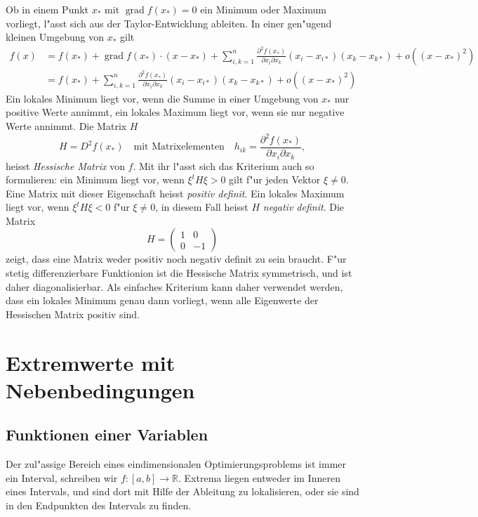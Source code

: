 Ob in einem Punkt $x_*$ mit $\operatorname{grad}f(x_*)=0$ ein
Minimum oder Maximum vorliegt, l"asst sich aus der Taylor-Entwicklung
ableiten. In einer gen"ugend kleinen Umgebung von $x_*$ gilt
\begin{align*}
f(x)&=f(x_*)+\operatorname{grad}f(x_*)\cdot (x-x_*)+
\sum_{i,k=1}^n\frac{\partial^2 f(x_*)}{\partial x_i\partial x_k}(x_i-x_{i*})(x_k-x_{k*})+o((x-x_*)^2)
\\
&=f(x_*)+
\sum_{i,k=1}^n\frac{\partial^2 f(x_*)}{\partial x_i\partial x_k}(x_i-x_{i*})(x_k-x_{k*})+o((x-x_*)^2)
\end{align*}
Ein lokales Minimum liegt vor, wenn die Summe in einer Umgebung
von $x_*$ nur positive Werte annimmt, ein lokales Maximum liegt vor,
wenn sie nur negative Werte annimmt.
Die Matrix $H$
\begin{equation}
H=D^2f(x_*) \quad\text{mit Matrixelementen}\quad
h_{ik}=
\frac{\partial^2 f(x_*)}{\partial x_i\partial x_k},
\end{equation}
heisst {\it Hessische Matrix} von $f$.
Mit ihr l"asst sich das Kriterium auch so formulieren: ein Minimum liegt vor,
wenn $\xi^t H\xi > 0$ gilt f"ur jeden Vektor $\xi\ne 0$.
Eine Matrix mit dieser Eigenschaft heisst {\it positiv definit}.
Ein lokales Maximum liegt vor, wenn $\xi^tH\xi<0$ f"ur $\xi\ne 0$,
in diesem Fall heisst $H$ {\it negativ definit}. Die Matrix 
\[
H=\begin{pmatrix}
1&0\\
0&-1
\end{pmatrix}
\]
zeigt, dass eine Matrix weder positiv noch negativ definit zu sein
braucht.
F"ur stetig differenzierbare Funktionion ist die Hessische Matrix
symmetrisch, und ist daher diagonalisierbar.
Als einfaches Kriterium kann daher
verwendet werden, dass ein lokales Minimum genau dann vorliegt,
wenn alle Eigenwerte der Hessischen Matrix positiv sind.

\section{Extremwerte mit Nebenbedingungen}
\subsection{Funktionen einer Variablen}
Der zul"assige Bereich eines eindimensionalen Optimierungsproblems
ist immer ein Interval, schreiben wir $f\colon[a,b]\to\mathbb R$.
Extrema
liegen entweder im Inneren eines Intervals, und sind dort mit
Hilfe der Ableitung zu lokalisieren, oder sie sind in den
Endpunkten des Intervals zu finden.

